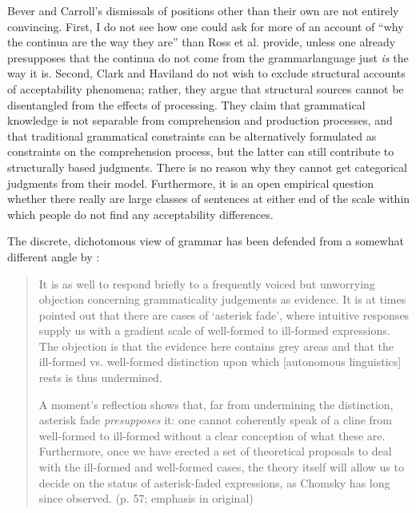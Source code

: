 Bever and Carroll's dismissals of positions other than their own are not entirely convincing. First, I do not see how one could ask for more of an account of ``why the continua are the way they are'' than Ross et al. provide, unless one already presupposes that  the continua  do not  come from the  grammar\schdash{}language just \textit{is} the way it is. Second, Clark and Haviland do not wish to exclude structural accounts of acceptability phenomena; rather, they argue that structural sources cannot be disentangled from the effects of processing. They claim that grammatical knowledge is not separable from comprehension and production processes, and that traditional grammatical constraints can be alternatively formulated as constraints on the comprehension process, but the latter can still contribute to structurally based judgments. There is no reason why they cannot get categorical judgments from their model. Furthermore, it is an open empirical  question whether there really are large classes of sentences at either end of the scale within which people do not find any acceptability differences.

The  discrete,  dichotomous  view  of  grammar  has  been  defended  from  a somewhat different angle by \citet{Carr1990}:

\begin{quote}
It is as well to respond briefly to a frequently voiced but unworrying objection concerning grammaticality judgements as evidence. It is at
times pointed out that there are cases of `asterisk fade', where intuitive responses supply us with a gradient scale of well-formed to ill-formed expressions. The objection is that the evidence here contains grey areas and that the ill-formed vs. well-formed distinction upon which  [autonomous linguistics] rests is thus undermined.

A moment's reflection shows that, far from undermining the distinction, asterisk fade \textit{presupposes} it: one cannot coherently speak of a cline from well-formed to ill-formed without a clear conception of what these are. Furthermore, once we have erected a set of theoretical proposals to deal with the ill-formed and well-formed cases, the theory itself will allow us to decide on the status of asterisk-faded expressions, as Chomsky has long since observed. (p. 57; emphasis in original)
\end{quote}

